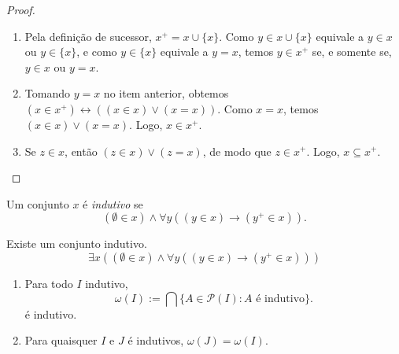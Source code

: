 \begin{proof}
    \leavevmode
        \begin{enumerate}[leftmargin=*, align=left, label=\textbf{(\alph*)}]
            \item Pela definição de sucessor, $x^+ = x \cup \{x\}$. Como $y \in x \cup \{x\}$ equivale a $y \in x$ ou $y \in \{x\}$, e como $y \in \{x\}$ equivale a $y = x$, temos $y \in x^+$ se, e somente se, $y \in x$ ou $y = x$. \blackproof
            \item Tomando $y=x$ no item anterior, obtemos $(x \in x^+) \leftrightarrow ((x \in x) \lor (x = x))$. Como $x = x$, temos $(x \in x) \lor (x = x)$. Logo, $x \in x^+$. \blackproof
            \item Se $z \in x$, então $(z \in x) \lor (z = x)$, de modo que $z \in x^+$. Logo, $x \subseteq x^+$. \blackproof
        \end{enumerate}
\end{proof}

\begin{definition}
    Um conjunto $x$ é \emph{indutivo} se
        \[
            (\emptyset \in x) \land \forall y ( (y \in x) \rightarrow (y^+ \in x)).
        \]
\end{definition}

\begin{axiom}[Infinito]
    Existe um conjunto indutivo.
        \[
            \boxed{
                \exists x ( (\emptyset \in x) \land \forall y ((y \in x) \rightarrow (y^+ \in x)) )
            }
        \]
\end{axiom}

\begin{proposition} \label{prop.set:omega}
    \leavevmode
        \begin{enumerate}[leftmargin=*, align=left, label=\textbf{(\alph*)}]
            \item Para todo $I$ indutivo,
                \[
                    \omega(I) := \bigcap \{A \in \mathcal{P}{(I)} : A \text{ é indutivo}\}.
                \]
            é indutivo.
            \item Para quaisquer $I$ e $J$ é indutivos, $\omega(J) = \omega(I)$.
        \end{enumerate}  
\end{proposition}

